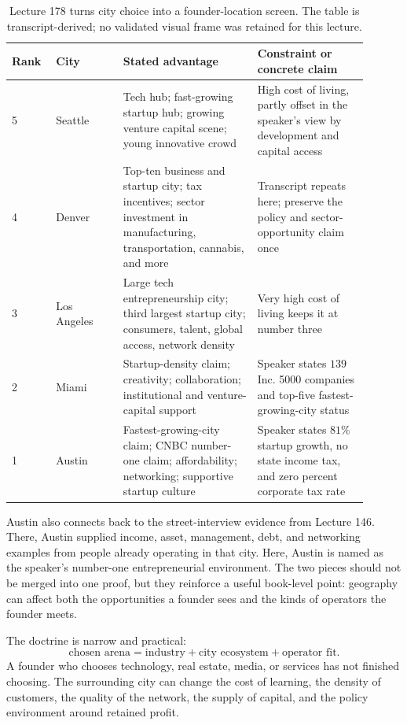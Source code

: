 \documentclass[11pt,oneside]{book}
\begin{document}
\begin{table}
\centering
\small
\begin{tabular}{p{0.10\linewidth}p{0.17\linewidth}p{0.34\linewidth}p{0.29\linewidth}}
\hline
Rank & City & Stated advantage & Constraint or concrete claim \\
\hline
5 & Seattle &
Tech hub; fast-growing startup hub; growing venture capital scene; young innovative crowd &
High cost of living, partly offset in the speaker's view by development and capital access \\
4 & Denver &
Top-ten business and startup city; tax incentives; sector investment in manufacturing, transportation, cannabis, and more &
Transcript repeats here; preserve the policy and sector-opportunity claim once \\
3 & Los Angeles &
Large tech entrepreneurship city; third largest startup city; consumers, talent, global access, network density &
Very high cost of living keeps it at number three \\
2 & Miami &
Startup-density claim; creativity; collaboration; institutional and venture-capital support &
Speaker states \(139\) Inc. 5000 companies and top-five fastest-growing-city status \\
1 & Austin &
Fastest-growing-city claim; CNBC number-one claim; affordability; networking; supportive startup culture &
Speaker states \(81\%\) startup growth, no state income tax, and zero percent corporate tax rate \\
\hline
\end{tabular}
\caption{Lecture 178 turns city choice into a founder-location screen. The table is transcript-derived; no validated visual frame was retained for this lecture.}
\end{table}

Austin also connects back to the street-interview evidence from Lecture 146. There, Austin supplied income, asset, management, debt, and networking examples from people already operating in that city. Here, Austin is named as the speaker's number-one entrepreneurial environment. The two pieces should not be merged into one proof, but they reinforce a useful book-level point: geography can affect both the opportunities a founder sees and the kinds of operators the founder meets.

The doctrine is narrow and practical:
\[
\text{chosen arena}
=
\text{industry}
+
\text{city ecosystem}
+
\text{operator fit}.
\]
A founder who chooses technology, real estate, media, or services has not finished choosing. The surrounding city can change the cost of learning, the density of customers, the quality of the network, the supply of capital, and the policy environment around retained profit.
\end{document}
